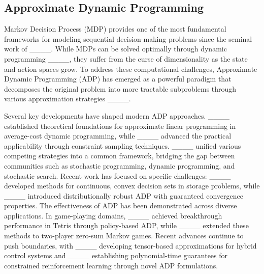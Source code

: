 \subsection{Approximate Dynamic Programming}\label{sec:related_sdm}
Markov Decision Process (MDP) provides one of the most fundamental frameworks for modeling sequential decision-making problems since the seminal work of ____. While MDPs can be solved optimally through dynamic programming ____, they suffer from the curse of dimensionality as the state and action spaces grow. To address these computational challenges, Approximate Dynamic Programming (ADP) has emerged as a powerful paradigm that decomposes the original problem into more tractable subproblems through various approximation strategies ____.

Several key developments have shaped modern ADP approaches. ____ established theoretical foundations for approximate linear programming in average-cost dynamic programming, while ____ advanced the practical applicability through constraint sampling techniques. ____ unified various competing strategies into a common framework, bridging the gap between communities such as stochastic programming, dynamic programming, and stochastic search. Recent work has focused on specific challenges: ____ developed methods for continuous, convex decision sets in storage problems, while ____ introduced distributionally robust ADP with guaranteed convergence properties. The effectiveness of ADP has been demonstrated across diverse applications. In game-playing domains, ____ achieved breakthrough performance in Tetris through policy-based ADP, while ____ extended these methods to two-player zero-sum Markov games. Recent advances continue to push boundaries, with ____ developing tensor-based approximations for hybrid control systems and ____ establishing polynomial-time guarantees for constrained reinforcement learning through novel ADP formulations.

